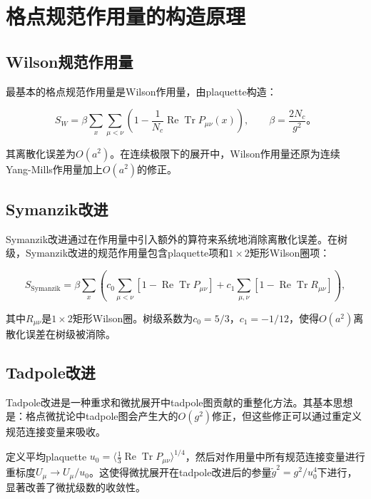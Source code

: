\documentclass[12pt,a4paper]{ctexart}
\theoremstyle{definition}
\begin{document}
\section{格点规范作用量的构造原理}

\subsection{Wilson规范作用量}

最基本的格点规范作用量是Wilson作用量，由plaquette构造：

\begin{equation}
S_W = \beta \sum_x \sum_{\mu<\nu} \left(1 - \frac{1}{N_c}\operatorname{Re}\operatorname{Tr} P_{\mu\nu}(x)\right), \qquad \beta = \frac{2N_c}{g^2}。
\label{eq:wilson_action}
\end{equation}

其离散化误差为$O(a^2)$。在连续极限下的展开中，Wilson作用量还原为连续Yang-Mills作用量加上$O(a^2)$的修正。

\subsection{Symanzik改进}

Symanzik改进通过在作用量中引入额外的算符来系统地消除离散化误差。在树级，Symanzik改进的规范作用量包含plaquette项和$1 \times 2$矩形Wilson圈项\cite{CLQCD2025}：

\begin{equation}
S_{\text{Symanzik}} = \beta \sum_x \left( c_0 \sum_{\mu<\nu} [1 - \operatorname{Re}\operatorname{Tr} P_{\mu\nu}] + c_1 \sum_{\mu,\nu} [1 - \operatorname{Re}\operatorname{Tr} R_{\mu\nu}] \right),
\label{eq:symanzik_action}
\end{equation}

其中$R_{\mu\nu}$是$1 \times 2$矩形Wilson圈。树级系数为$c_0 = 5/3$，$c_1 = -1/12$，使得$O(a^2)$离散化误差在树级被消除。

\subsection{Tadpole改进}

Tadpole改进\cite{CLQCD2025}是一种重求和微扰展开中tadpole图贡献的重整化方法。其基本思想是：格点微扰论中tadpole图会产生大的$O(g^2)$修正，但这些修正可以通过重定义规范连接变量来吸收。

定义平均plaquette $u_0 = \langle \frac{1}{3}\operatorname{Re}\operatorname{Tr} P_{\mu\nu} \rangle^{1/4}$，然后对作用量中所有规范连接变量进行重标度$U_\mu \to U_\mu/u_0$。这使得微扰展开在tadpole改进后的参量$\tilde{g}^2 = g^2/u_0^4$下进行，显著改善了微扰级数的收敛性。
\end{document}
